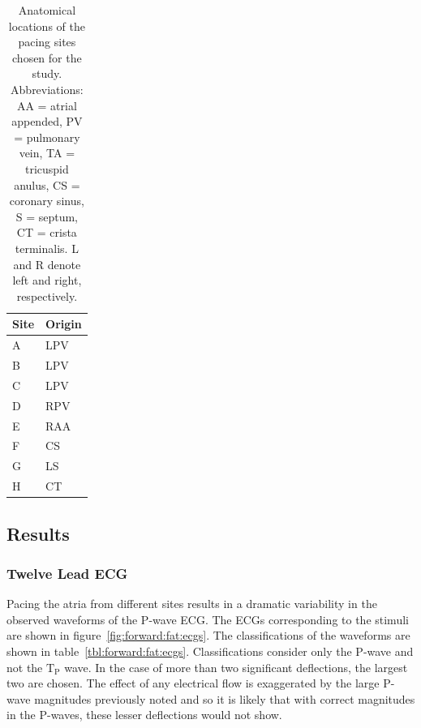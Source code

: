 \begin{table}
\caption[Pacing Sites Around The Atria]{
\label{tbl:forward:fat:sites}
Anatomical locations of the pacing sites chosen for the study.
Abbreviations: AA = atrial appended, PV = pulmonary vein, TA = tricuspid anulus,
CS = coronary sinus, S = septum, CT = crista terminalis.
L and R denote left and right, respectively.
}
\begin{center}
\begin{tabular}{l l}
\toprule
Site &  Origin \\
\midrule
A & LPV \\
B & LPV \\
C & LPV \\
D & RPV \\
E & RAA \\
F & CS \\
G & LS \\
H & CT \\
\bottomrule
\end{tabular}
\end{center}
\end{table}
\subsection{Results}

\subsubsection{Twelve Lead ECG}

Pacing the atria from different sites results in a dramatic variability in the
observed waveforms of the P-wave ECG.
The ECGs corresponding to the stimuli are shown in
figure~\ref{fig:forward:fat:ecgs}.
The classifications of the waveforms are shown in
table~\ref{tbl:forward:fat:ecgs}.
Classifications consider only the P-wave and not the $\text{T}_{\text{P}}$
wave.
In the case of more than two significant deflections, the largest two are
chosen.
The effect of any electrical flow is exaggerated by the large P-wave magnitudes
previously noted and so it is likely that with correct magnitudes in the
P-waves, these lesser deflections would not show.


